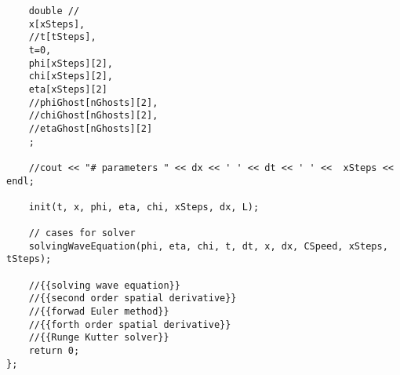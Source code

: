 \documentclass[10pt,fleqn,reqno,a4paper]{article}
\begin{document}
\begin{verbatim}
    double //
    x[xSteps],
    //t[tSteps],
    t=0,
    phi[xSteps][2],
    chi[xSteps][2],
    eta[xSteps][2]
    //phiGhost[nGhosts][2],
    //chiGhost[nGhosts][2],
    //etaGhost[nGhosts][2]
    ;

    //cout << "# parameters " << dx << ' ' << dt << ' ' <<  xSteps << endl;

    init(t, x, phi, eta, chi, xSteps, dx, L);

    // cases for solver
    solvingWaveEquation(phi, eta, chi, t, dt, x, dx, CSpeed, xSteps, tSteps);

    //{{solving wave equation}}
    //{{second order spatial derivative}}
    //{{forwad Euler method}}
    //{{forth order spatial derivative}}
    //{{Runge Kutter solver}}
	return 0;
};
\end{verbatim}
\end{document}
